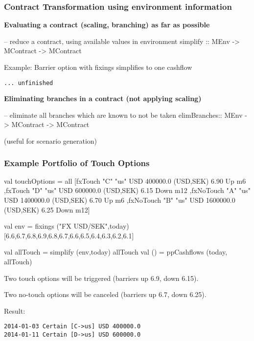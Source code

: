 \documentclass[xcolor=dvipsnames,11pt]{beamer}
\renewcommand{\emph}[1]{\textcolor{structure!90}{#1}}
\begin{document}
\begin{frame}[fragile,t]
    \frametitle{Contract Transformation using environment information}

\textbf{Evaluating a contract (scaling, branching) as far as possible}
\begin{hscode}
-- reduce a contract, using available values in environment
simplify :: MEnv -> MContract -> MContract
\end{hscode}

\emph{Example:} Barrier option with fixings simplifies to one cashflow
\begin{scriptsize}
\begin{verbatim}
... unfinished
\end{verbatim}
\end{scriptsize}

\hrulefill

\textbf{Eliminating branches in a contract (not applying scaling)}
\begin{hscode}
-- eliminate all branches which are known to not be taken
elimBranches:: MEnv -> MContract -> MContract
\end{hscode}

(useful for scenario generation)
\end{frame}


\begin{frame}[fragile,t]
\frametitle{Example Portfolio of Touch Options}

\begin{hscodesmall}
val touchOptions = all
 [fxTouch   "C" "us" USD  400000.0 (USD,SEK) 6.90 Up   m6
 ,fxTouch   "D" "us" USD  600000.0 (USD,SEK) 6.15 Down m12
 ,fxNoTouch "A" "us" USD 1400000.0 (USD,SEK) 6.70 Up   m6
 ,fxNoTouch "B" "us" USD 1600000.0 (USD,SEK) 6.25 Down m12]

val env = fixings ("FX USD/SEK",today) 
   [6.6,6.7,6.8,6.9,6.8,6.7,6.6,6.5,6.4,6.3,6.2,6.1]

val allTouch = simplify (env,today) allTouch
val () = ppCashflows (today, allTouch)
\end{hscodesmall}

{\scriptsize
Two touch options will be triggered (barriers up 6.9, down 6.15).

Two no-touch options will be canceled (barriers up 6.7, down 6.25).
}
\vfill
\emph{Result:}
\begin{verbatim}
2014-01-03 Certain [C->us] USD 400000.0
2014-01-11 Certain [D->us] USD 600000.0
\end{verbatim}

\end{frame}
\end{document}
